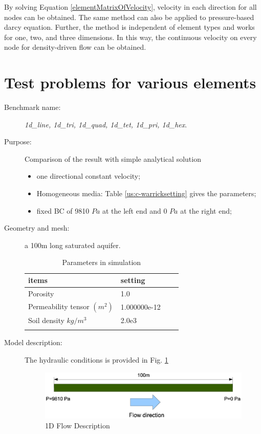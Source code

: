 By solving Equation \ref{elementMatrixOfVelocity}, velocity in each direction for all nodes can be obtained. The same method can also be applied to pressure-based darcy equation. Further, the method is independent of element types and works for one, two, and three dimensions. In this way, the continuous velocity on every node for density-driven flow can be obtained.

\section{Test problems for various elements}

\begin{description}
  \item[Benchmark name:] \emph{1d\_line, 1d\_tri, 1d\_quad, 1d\_tet, 1d\_pri, 1d\_hex}.
  \item[Purpose:] Comparison of the result with simple analytical solution
     \begin{itemize}
     \item one directional constant velocity;
     \item Homogeneous media: Table \ref{us:c-warricksetting} gives the parameters;
     \item fixed BC of 9810 $Pa$ at the left end and 0 $Pa$ at the right end;
     \end{itemize}
  \item[Geometry and mesh:] a 100m long saturated aquifer.

\begin{table}[H]
 \centering
 \caption{Parameters in simulation}
 \centering \label{fm:1dparameters}
 \begin{tabular}{llll}
 \hline\hline\noalign{\smallskip}
 items & setting  \\ \hline
 Porosity              & 1.0 \\
 Permeability tensor $(m^2)$  &  1.000000e-12  \\
 Soil density  $kg/m^3$  & 2.0e3 \\
\noalign{\smallskip}\hline\hline
 \end{tabular}
\end{table}

\item[Model description:] The hydraulic conditions is provided in Fig. \ref{fm:1dflow}
\begin{figure}[h]
\begin{center}
\includegraphics[scale=0.6]{FLUID_MOMENTUM/figures/oneDproblem.eps}
\end{center}
\caption{1D Flow Description}
\label{fm:1dflow}
\end{figure}



\end{description}
